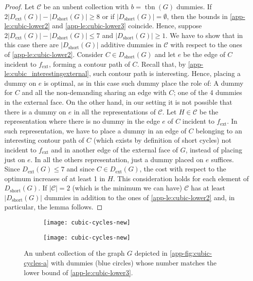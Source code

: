 \documentclass[runningheads]{llncs}
\newcommand{\tbn}{\operatorname{tbn}}
\newcommand{\ext}{\operatorname{ext}}
\newcommand{\short}{\operatorname{short}}
\begin{document}
\begin{proof}
Let $\mathcal{C}$ be an unbent collection with $b=\tbn(G)$ dummies. If $2|D_{\ext}(G)|-|D_{\short}(G)|\ge 8$ or if $|D_{\short}(G)|=\emptyset$, then the bounds in \cref{app-le:cubic-lower2} and \cref{app-le:cubic-lower3} coincide. 
Hence, suppose $2|D_{\ext}(G)|-|D_{\short}(G)|\le7$ and $|D_{\short}(G)|\ge 1$. We have to show that in this case there are $|D_{\short}(G)|$ additive dummies in $\mathcal{C}$ with respect to the ones of \cref{app-le:cubic-lower2}. Consider $C\in D_{\short}(G)$ and let $e$ be the edge of $C$ incident to $f_{\ext}$, forming a contour path of $C$. Recall that, by \cref{app-le:cubic_interestingexternal}, such contour path is interesting. Hence, placing a dummy on $e$ is optimal, as in this case such dummy place the role of: A dummy for $C$ and all the non-demanding sharing an edge with $C$; one of the 4 dummies in the external face. On the other hand, in our setting it is not possible that there is a dummy on $e$ in all the representations of $\mathcal{C}$. Let $H\in \mathcal{C}$ be the representation where there is no dummy in the edge $e$ of $C$ incident to $f_{\ext}$. In such representation, we have to place a dummy in an edge of $C$ belonging to an interesting contour path of $C$ (which exists by definition of short cycles) not incident to $f_{\ext}$ and in another edge of the external face of $G$, instead of placing just on $e$. In all the others representation, just a dummy placed on $e$ suffices. Since $D_{\ext}(G)\le 7$ and since $C\in D_{\ext}(G)$, the cost with respect to the optimum increases of at least 1 in $H$. This consideration holds for each element of $D_{\short}(G)$. If $|\mathcal{C}|=2$ (which is the minimum we can have) $\mathcal{C}$ has at least $|D_{\short}(G)|$ dummies in addition to the ones of \cref{app-le:cubic-lower2} and, in particular, the lemma follows.
\end{proof}


\begin{figure}[t]
  \begin{subfigure}{0.35\textwidth}
    \centering
    \texttt{[image: cubic-cycles-new]}
    \subcaption{}
     \label{app-fig:cubic-cycles-1-a}
  \end{subfigure}
  \hfil
  \begin{subfigure}{0.35\textwidth}
    \centering
    \texttt{[image: cubic-cycles-new]}
    \subcaption{}
    \label{app-fig:cubic-cycles-1-b}
  \end{subfigure}
  \hfill
  \caption{An unbent collection of the graph $G$ depicted in
    \cref{app-fig:cubic-cycles-a} with dummies (blue circles) whose
    number matches the lower bound of \cref{app-le:cubic-lower3}.}
  \label{app-fig:cubic-cycles-1}
\end{figure}
\end{document}
